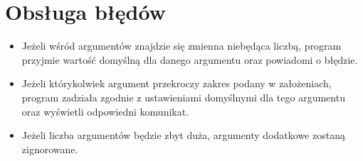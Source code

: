 \documentclass[a4paper,12pt]{article}
\begin{document}
\section{Obsługa błędów}
\begin{itemize}
\item Jeżeli wśród argumentów znajdzie się zmienna niebędąca liczbą, program przyjmie wartość domyślną dla danego argumentu oraz powiadomi o błędzie.
\item Jeżeli którykolwiek argument przekroczy zakres podany w założeniach, program zadziała zgodnie z ustawieniami domyślnymi dla tego argumentu oraz wyświetli odpowiedni komunikat.
\item Jeżeli liczba argumentów będzie zbyt duża, argumenty dodatkowe zostaną zignorowane.
\end{itemize}
\newpage
\end{document}
